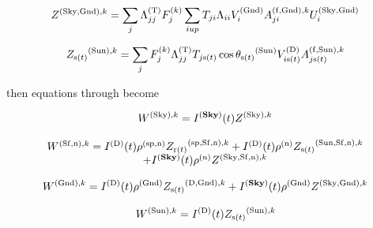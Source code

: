 \begin{equation}
{Z^{{\rm{(Sky, Gnd)}},k}} = \sum\limits_j {\Lambda_{jj}^{{\rm{(T)}}}F_j^{{\rm{(}}k{\rm{)}}}\sum\limits_{i{\rm{ }}up} {{T_{ji}}{\Lambda_{ii}}V_i^{{\rm{(Gnd)}}}A_{ji}^{{\rm{(f, Gnd), }}k}U_i^{{\rm{(Sky, Gnd)}}}} }
\end{equation}

\begin{equation}
{Z_{{\rm{s(}}t{\rm{)}}}}^{{\rm{(Sun)}},k} = \sum\limits_j {F_j^{{\rm{(}}k{\rm{)}}}\Lambda_{jj}^{{\rm{(T)}}}{T_{j{\rm{ s}}(t)}}\cos {\theta_{{\rm{s(}}t{\rm{)}}}}^{{\rm{(Sun)}}}V_{i{\rm{ s(}}t{\rm{)}}}^{{\rm{(D)}}}A_{j{\rm{ s(}}t{\rm{)}}}^{{\rm{(f, Sun), }}k}}
\end{equation}

then equations through become

\begin{equation}
{W^{{\rm{(Sky), }}k}} = {I^{({\bf{Sky}})}}(t){Z^{{\rm{(Sky), }}k}}
\end{equation}

\begin{equation}
\begin{array}{c}{W^{{\rm{(Sf,n)}},k}} = {I^{{\rm{(D)}}}}(t){\rho ^{{\rm{(sp, n)}}}}{Z_{{\rm{r(}}t{\rm{)}}}}^{{\rm{(sp, Sf, n)}},k} + {I^{{\rm{(D)}}}}(t){\rho ^{{\rm{(n)}}}}{Z_{{\rm{s(}}t{\rm{)}}}}^{{\rm{(Sun, Sf, n)}},k}\\ + {I^{({\bf{Sky}})}}(t){\rho ^{{\rm{(n)}}}}{Z^{{\rm{(Sky, Sf, n)}},k}}\end{array}
\end{equation}

\begin{equation}
{W^{{\rm{(Gnd)}},k}} = {I^{{\rm{(D)}}}}(t){\rho ^{{\rm{(Gnd)}}}}{Z_{{\rm{s(}}t{\rm{)}}}}^{{\rm{(D, Gnd)}},k} + {I^{({\bf{Sky}})}}(t){\rho ^{{\rm{(Gnd)}}}}{Z^{{\rm{(Sky, Gnd)}},k}}
\end{equation}

\begin{equation}
{W^{{\rm{(Sun)}},k}} = {I^{{\rm{(D)}}}}(t){Z_{{\rm{s(}}t{\rm{)}}}}^{{\rm{(Sun)}},k}
\end{equation}

